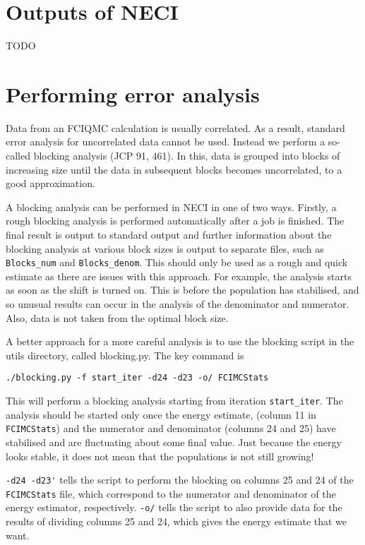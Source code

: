 \documentclass[a4paper,notitlepage]{scrreprt}
\let\code\lstinline
\begin{document}
\section{Outputs of NECI}

TODO

\section{Performing error analysis}
    Data from an FCIQMC calculation is usually correlated. As a result,
    standard error analysis for uncorrelated data cannot be used. Instead we
    perform a so-called blocking analysis (JCP 91, 461). In this, data is
    grouped into blocks of increasing size until the data in subsequent blocks
    becomes uncorrelated, to a good approximation.

    A blocking analysis can be performed in NECI in one of two ways. Firstly,
    a rough blocking analysis is performed automatically after a job is finished.
    The final result is output to standard output and further information about
    the blocking analysis at various block sizes is output to separate files, 
	such as \code{Blocks_num} and \code{Blocks_denom}. This should only be
	used as a rough
    and quick estimate as there are issues with this approach. For example, the
    analysis starts as soon as the shift is turned on. This is before the
    population has stabilised, and so unusual results can occur in the analysis
    of the denominator and numerator. Also, data is not taken from the optimal
    block size.

    A better approach for a more careful analysis is to use the blocking script
    in the utils directory, called blocking.py. The key command is
	\begin{lstlisting}[gobble=4]
		./blocking.py -f start_iter -d24 -d23 -o/ FCIMCStats
    \end{lstlisting}

	This will perform a blocking analysis starting from iteration
	\code{start_iter}.
    The analysis should be started only once the energy estimate, (column 11 in
	\code{FCIMCStats}) and the numerator and denominator (columns 24 and
	25) have
    stabilised and are fluctuating about some final value. Just because the
    energy looks stable, it does not mean that the populations is not still
    growing!

	\code{-d24 -d23'} tells the script to perform the blocking on columns 25 and
	24 of the \code{FCIMCStats} file, which correspond to the numerator and
	denominator of the energy estimator, respectively. \code{-o/} tells the script
    to also provide data for the results of dividing columns 25 and 24, which
    gives the energy estimate that we want.
\end{document}

